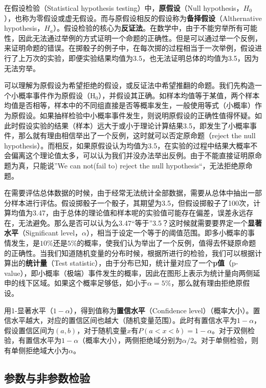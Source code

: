 \documentclass[11pt]{article}
\begin{document}
在假设检验（Statistical hypothesis testing）中，\textbf{原假设}（Null hypothesis，$H_0$），也称为零假设或虚无假设。而与原假设相反的假设称为\textbf{备择假设}（Althernative hypothesis，$H_a$）。假设检验的核心为\textbf{反证法}。在数学中，由于不能穷举所有可能性，因此无法通过举例的方式证明一个命题的正确性。但是可以通过举一个反例，来证明命题的错误。在掷骰子的例子中，在每次掷的过程相当于一次举例，假设进行了上万次的实验，即便实验结果均值为3.5，也无法证明总体的均值为3.5，因为无法穷举。

可以理解为原假设为希望拒绝的假设，或反证法中希望推翻的命题。我们先构造一个小概率事件作为原假设（$\text{H}_0$），并假设其正确。如样本均值等于某值，两个样本均值是否相等，样本中的不同组直接是否等概率发生，一般使用等式（小概率）作为原假设。如果抽样检验中小概率事件发生，则说明原假设的正确性值得怀疑。如此时假设实验的结果（样本）远大于或小于理论计算结果3.5，即发生了小概率事件，那么就有理由相信举出了一个反例，这时就可以否定原命题（reject the null hypothesis）。而相反，如果原假设认为均值为3.5，在实验的过程中结果大概率不会偏离这个理论值太多，可以认为我们并没办法举出反例。由于不能直接证明原命题为真，只能说”We can not(fail to) reject the null hypothesis“，无法拒绝原命题。

在需要评估总体数据的时候，由于经常无法统计全部数据，需要从总体中抽出一部分样本进行评估。假设掷骰子一个骰子，其期望为3.5，但假设掷骰子了100次，计算均值为3.47，由于总体的理论值和样本呢的实验值可能存在偏差，误差永远存在，无法避免。那么是否可以认为么3.47“等于”3.5？这时候就需要要界定一个\textbf{显著水平}（Significant level，$\alpha$），相当于设定一个等于的阈值范围。即多小概率的事情发生，是$10\%$还是$5\%$的概率，使我们认为举出了一个反例，值得去怀疑原命题的正确性。当我们知道随机变量的分布时候，根据所进行的检验，我们可以根据计算出的\textbf{统计量}（Test statistic），由于分布已知，统计量对应了一个\textbf{p值}（p-value），即小概率（极端）事件发生的概率，因此在图形上表示为统计量向两侧延申的线下区域。如果这个概率足够低，如小于$\alpha=5\%$，那么就有理由拒绝原假设。

用1-显著水平（$1-\alpha$），得到值称为\textbf{置信水平}（Confidence level）（概率大小）。置信水平越大，对应的置信区间也越大（随机变量范围）。此时有置信水平为$1-\alpha$，假设置信区间为$(a,b)$，对于随机变量$x$有$P(a<x<b)=1-\alpha$。对于双侧检验，有置信水平为$1-\alpha$（概率大小），两侧拒绝域分别为$\alpha/2$。对于单侧检验，则有单侧拒绝域大小为$\alpha$。

\subsection{参数与非参数检验}
\end{document}
